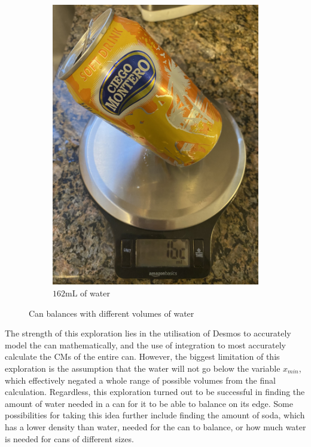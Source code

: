 \documentclass[11pt]{article}
\begin{document}
\begin{figure}[H]
\begin{subfigure}{.3\textwidth}
            \includegraphics[width=.93\linewidth]{images/scale_162.JPG}
            \vspace{-8pt}
            \caption{$162 \mathrm{mL}$ of water}
            \label{fig:scale-162}
        \end{subfigure}
        \vspace{-10pt}
        \caption{Can balances with different volumes of water}
        \label{fig:scale}
    \end{figure}
    \vspace{-10pt}

    The strength of this exploration lies in the utilisation of Desmos to accurately model the can mathematically, and the use of integration to most accurately calculate the CMs of the entire can. However, the biggest limitation of this exploration is the assumption that the water will not go below the variable $x_{min}$, which effectively negated a whole range of possible volumes from the final calculation. Regardless, this exploration turned out to be successful in finding the amount of water needed in a can for it to be able to balance on its edge. Some possibilities for taking this idea further include finding the amount of soda, which has a lower density than water, needed for the can to balance, or how much water is needed for cans of different sizes.

    \newpage
    \renewcommand{\thepage}{} %
    \nocite{can_ends}
    \nocite{helvetia_packaging}
    \nocite{isaac_physics}
    \nocite{moore_2021}
    \nocite{mulkins_2019}
    \nocite{talat_cans}
    \nocite{talat_density}
    \nocite{water_density}
    \printbibliography
\end{document}
